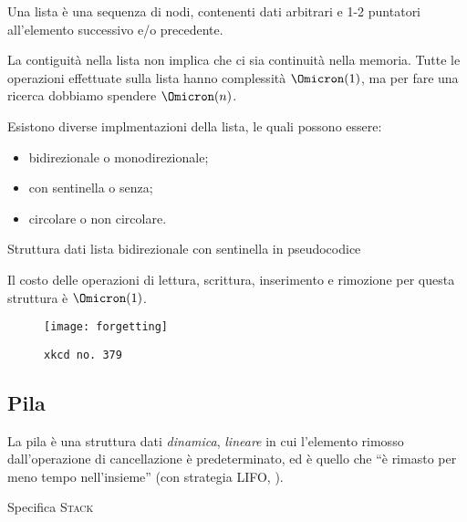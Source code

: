 Una lista è una sequenza di nodi, contenenti dati arbitrari e 1-2 puntatori all'elemento successivo e/o precedente.

La contiguità nella lista non implica che ci sia continuità nella memoria.
Tutte le operazioni effettuate sulla lista hanno complessità \(\Omicron(1)\), ma per fare una ricerca dobbiamo spendere \(\Omicron(n)\).

Esistono diverse implmentazioni della lista, le quali possono essere:
\begin{itemize}
	\item bidirezionale o monodirezionale;
	\item con sentinella o senza;
	\item circolare o non circolare.
\end{itemize}


\begin{algorithm}[H]
\caption*{Struttura dati lista bidirezionale con sentinella in pseudocodice}

\end{algorithm}
Il costo delle operazioni di lettura, scrittura, inserimento e rimozione per questa struttura è \(\Omicron(1)\).

\begin{figure}[p]
\begin{code}
	\label{code:java-lista-bidirezionale-sentinella}
\end{code}
\end{figure}

\begin{figure}[H]
	\centering
	\texttt{[image: forgetting]}
	\caption[]{\texttt{xkcd no.\ 379}}
	\label{fig:forgetting}
\end{figure}

\subsection{Pila}

La pila è una struttura dati \emph{dinamica}, \emph{lineare} in cui l'elemento rimosso dall'operazione di cancellazione è predeterminato, ed è quello che \enquote{è rimasto per meno tempo nell'insieme} (con strategia \textsc{LIFO}, ).

\begin{algorithm}[H]
\caption*{Specifica \textsc{Stack}}

\end{algorithm}

